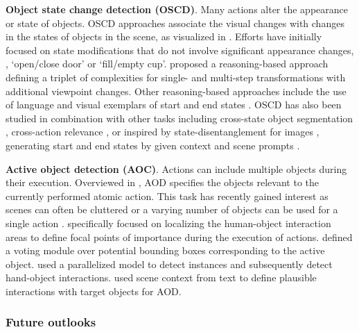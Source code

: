 \noindent
\textbf{Object state change detection (OSCD)}. Many actions alter the appearance or state of objects. OSCD approaches associate the visual changes with changes in the states of objects in the scene, as visualized in . Efforts \citep{alayrac2017joint,damen2014you,liu2017jointly,zhuo2019explainable} have initially focused on state modifications that do not involve significant appearance changes, \eg, `open/close door' or `fill/empty cup'. \citet{hong2021transformation} proposed a reasoning-based approach defining a triplet of complexities for single- and multi-step transformations with additional viewpoint changes. Other reasoning-based approaches include the use of language \citep{xue2024learning} and visual exemplars of start and end states \citep{souvcek2022look}. OSCD has also been studied in combination with other tasks including cross-state object segmentation \citep{yu2023video}, cross-action relevance \citep{alayrac2024multi}, or inspired by state-disentanglement for images \citep{gouidis2023leveraging,nagarajan2018attributes,saini2022disentangling}, generating start and end states by given context and scene prompts \citep{saini2023chop}.

\noindent
\textbf{Active object detection (AOC)}. Actions can include multiple objects during their execution. Overviewed in , AOD specifies the objects relevant to the currently performed atomic action. This task has recently gained interest as scenes can often be cluttered \citep{ragusa2021meccano} or a varying number of objects can be used for a single action \citep{miech2019howto100m}. \citet{nagarajan2019grounded} specifically focused on localizing the human-object interaction areas to define focal points of importance during the execution of actions. \citep{fu2021sequential} defined a voting module over potential bounding boxes corresponding to the active object. \citet{kim2021hotr} used a parallelized model to detect instances and subsequently detect hand-object interactions. \citet{yang2024active} used scene context from text to define plausible interactions with target objects for AOD.  


\subsubsection{Future outlooks}

